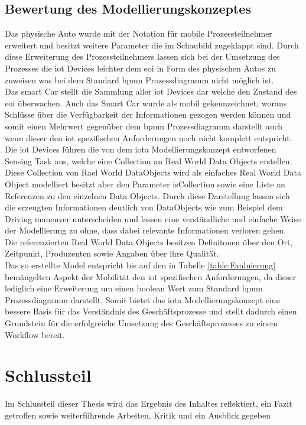 \documentclass[a4paper, 12pt, twoside, headsepline=true]{scrartcl} %
\begin{document}
\subsection{Bewertung des Modellierungskonzeptes}
Das physische Auto wurde mit der Notation für mobile Prozessteilnehmer erweitert und besitzt weitere Parameter die im Schaubild zugeklappt sind. Durch diese Erweiterung des Prozessteilnehmers lassen sich bei der Umsetzung des Prozesses die  \ac{iot} Devices leichter dem \ac{eoi} in Form des physischen Autos  zu zuweisen was bei dem Standard \ac{bpmn} Prozessdiagramm nicht möglich ist.\\
Das smart Car stellt die Sammlung aller \ac{iot} Devices dar welche den Zustand des \ac{eoi} überwachen. Auch das Smart Car wurde als mobil gekennzeichnet, woraus Schlüsse über die Verfügbarkeit der Informationen gezogen werden können und somit einen Mehrwert gegenüber dem \ac{bpmn} Prozessdiagramm darstellt auch wenn dieser den \ac{iot} spezifischen Anforderungen noch nicht komplett entspricht.\\
Die \ac{iot} Devices führen die von dem \ac{iota} Modellierungskonzept entworfenen Sensing Task aus, welche eine Collection an Real World Data Objects erstellen. Diese Collection von Rael World DataObjects wird als einfaches Real World Data Object modelliert besitzt aber den Parameter isCollection sowie eine Liste an Referenzen zu den einzelnen Data Objects. Durch diese Darstellung lassen sich die erzeugten Informationen deutlich von DataObjects wie zum Beispiel dem Driving maneuver unterscheiden und lassen eine verständliche und einfache Weise der Modellierung zu ohne, dass dabei relevante Informationen verloren gehen. \\
Die referenzierten Real World Data Objects besitzen Definitonen über den Ort, Zeitpunkt, Produzenten sowie Angaben über ihre Qualität.\\

Das so erstellte Model entspricht bis auf den in Tabelle \ref{table:Evaluierung} bemängelten Aspekt der Mobilität den \ac{iot} spezifischen Anforderungen, da dieser lediglich eine Erweiterung um einen boolean Wert zum Standard \ac{bpmn} Prozessdiagramm darstellt. Somit bietet das \ac{iota} Modellierungskonzept eine bessere Basis für das Verständnis des Geschäftsprozesse und stellt dadurch einen Grundstein für die erfolgreiche Umsetzung des Geschäftsprozesses zu einem Workflow bereit.

\newpage
\section{Schlussteil}
Im Schlussteil dieser Thesis wird das Ergebnis des Inhaltes reflektiert, ein Fazit getroffen sowie weiterführende Arbeiten, Kritik und ein Ausblick gegeben\\
\end{document}
